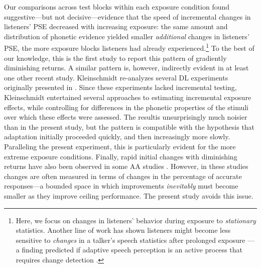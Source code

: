 \documentclass[
  11pt,
  man,mask,floatsintext]{apa6}
\begin{document}
Our comparisons across test blocks within each exposure condition found suggestive---but not decisive---evidence that the speed of incremental changes in listeners' PSE decreased with increasing exposure: the same amount and distribution of phonetic evidence yielded smaller \emph{additional} changes in listeners' PSE, the more exposure blocks listeners had already experienced.\footnote{Here, we focus on changes in listeners' behavior during exposure to \emph{stationary} statistics. Another line of work has shown listeners might become less sensitive to \emph{changes} in a talker's speech statistics after prolonged exposure \autocites[e.g.,][]{kraljic-samuel2011,saltzman-myers2021}[but see][]{theodore-monto2019}---a finding predicted if adaptive speech perception is an active process \autocite{magnuson-nusbaum2007} that requires change detection \autocite{qian2012}.} To the best of our knowledge, this is the first study to report this pattern of gradiently diminishing returns. A similar pattern is, however, indirectly evident in at least one other recent study. Kleinschmidt \autocite*[Experiment 3]{kleinschmidt2020} re-analyzes several DL experiments originally presented in \textcite{kleinschmidt-jaeger2016}. Since these experiments lacked incremental testing, Kleinschmidt entertained several approaches to estimating incremental exposure effects, while controlling for differences in the phonetic properties of the stimuli over which these effects were assessed. The resultis unsurprisingly much noisier than in the present study, but the pattern is compatible with the hypothesis that adaptation initially proceeded quickly, and then increasingly more slowly. Paralleling the present experiment, this is particularly evident for the more extreme exposure conditions. Finally, rapid initial changes with diminishing returns have also been observed in some AA studies \autocites{bieber2023}[SI \(\S3\)]{xie2021jep}. However, in these studies changes are often measured in terms of changes in the percentage of accurate responses---a bounded space in which improvements \emph{inevitably} must become smaller as they improve ceiling performance. The present study avoids this issue.
\end{document}
